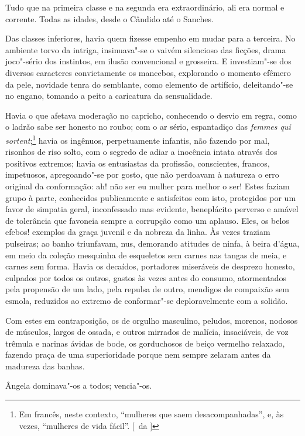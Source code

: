 Tudo que na primeira classe e na segunda era
extraordinário, ali era normal e corrente. Todas as idades, desde o
Cândido até o Sanches. 

Das classes inferiores, havia quem fizesse
empenho em mudar para a terceira. No ambiente torvo da intriga,
insinuava"-se o vaivém silencioso das ficções, drama joco"-sério dos
instintos, em ilusão convencional e grosseira. E investiam"-se dos
diversos caracteres convictamente os mancebos, explorando o momento
efêmero da pele, novidade tenra do semblante, como elemento de
artifício, deleitando"-se no engano, tomando a peito a caricatura da
sensualidade. 

Havia o que afetava moderação no capricho, conhecendo o
desvio em regra, como o ladrão sabe ser honesto no roubo; com o ar
sério, espantadiço das \textit{femmes qui sortent};\footnote{ Em francês, neste contexto, ``mulheres que saem desacompanhadas'', 
e, às vezes, ``mulheres de vida fácil''. [~da ]} havia os ingênuos,
perpetuamente infantis, não fazendo por mal, risonhos de riso solto,
com o segredo de adiar a inocência intata através dos positivos
extremos; havia os entusiastas da profissão, conscientes, francos,
impetuosos, apregoando"-se por gosto, que não perdoavam à natureza o
erro original da conformação: ah! não ser eu mulher para melhor o ser!
Estes faziam grupo à parte, conhecidos publicamente e satisfeitos com
isto, protegidos por um favor de simpatia geral, inconfessado mas
evidente, beneplácito perverso e amável de tolerância que favoneia
sempre a corrupção como um aplauso. Eles, os belos efebos! exemplos da
graça juvenil e da nobreza da linha. Às vezes traziam pulseiras; ao
banho triunfavam, nus, demorando atitudes de ninfa, à beira d'água, em
meio da coleção mesquinha de esqueletos sem carnes nas tangas de meia,
e carnes sem forma. Havia os decaídos, portadores miseráveis de
desprezo honesto, culpados por todos os outros, gastos às vezes antes
do consumo, atormentados pela propensão de um lado, pela repulsa de
outro, mendigos de compaixão sem esmola, reduzidos ao extremo de
conformar"-se deploravelmente com a solidão. 

Com estes em
contraposição, os de orgulho masculino, peludos, morenos, nodosos de
músculos, largos de ossada, e outros mirrados de malícia, insaciáveis,
de voz trêmula e narinas ávidas de bode, os gorduchosos de beiço
vermelho relaxado, fazendo praça de uma superioridade porque nem sempre
zelaram antes da madureza das banhas. 

Ângela dominava"-os a todos; vencia"-os. 

